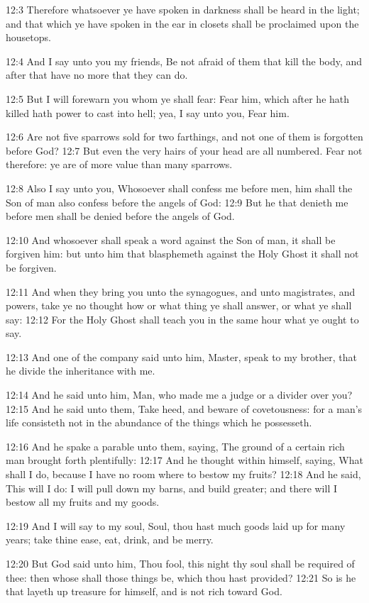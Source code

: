 12:3 Therefore whatsoever ye have spoken in darkness shall be heard in the light; and that which ye have spoken in the ear in closets shall be proclaimed upon the housetops.

12:4 And I say unto you my friends, Be not afraid of them that kill the body, and after that have no more that they can do.

12:5 But I will forewarn you whom ye shall fear: Fear him, which after he hath killed hath power to cast into hell; yea, I say unto you, Fear him.

12:6 Are not five sparrows sold for two farthings, and not one of them is forgotten before God?  12:7 But even the very hairs of your head are all numbered. Fear not therefore: ye are of more value than many sparrows.

12:8 Also I say unto you, Whosoever shall confess me before men, him shall the Son of man also confess before the angels of God: 12:9 But he that denieth me before men shall be denied before the angels of God.

12:10 And whosoever shall speak a word against the Son of man, it shall be forgiven him: but unto him that blasphemeth against the Holy Ghost it shall not be forgiven.

12:11 And when they bring you unto the synagogues, and unto magistrates, and powers, take ye no thought how or what thing ye shall answer, or what ye shall say: 12:12 For the Holy Ghost shall teach you in the same hour what ye ought to say.

12:13 And one of the company said unto him, Master, speak to my brother, that he divide the inheritance with me.

12:14 And he said unto him, Man, who made me a judge or a divider over you?  12:15 And he said unto them, Take heed, and beware of covetousness: for a man's life consisteth not in the abundance of the things which he possesseth.

12:16 And he spake a parable unto them, saying, The ground of a certain rich man brought forth plentifully: 12:17 And he thought within himself, saying, What shall I do, because I have no room where to bestow my fruits?  12:18 And he said, This will I do: I will pull down my barns, and build greater; and there will I bestow all my fruits and my goods.

12:19 And I will say to my soul, Soul, thou hast much goods laid up for many years; take thine ease, eat, drink, and be merry.

12:20 But God said unto him, Thou fool, this night thy soul shall be required of thee: then whose shall those things be, which thou hast provided?  12:21 So is he that layeth up treasure for himself, and is not rich toward God.

